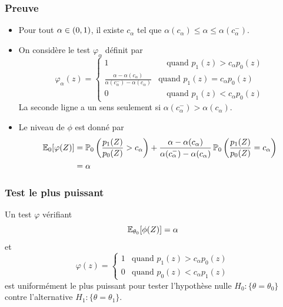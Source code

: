 \begin{frame}
\frametitle{Preuve}
\begin{itemize}
\item Pour tout $\alpha \in \left(0,1\right)$, il existe $c_\alpha$ tel que $\alpha(c_\alpha) \leq \alpha \leq \alpha(c_\alpha^-)$.
\item On considère le test $\varphi_\alpha$ définit par
$$
\varphi_\alpha(z)
=
\begin{cases}
1 & \quad \text{quand $p_1(z) > c_\alpha p_0(z)$} \\
\frac{\alpha - \alpha(c_\alpha)}{\alpha(c_\alpha^-)-\alpha(c_\alpha)} & \text{quand $p_1(z) = c_\alpha p_0(z)$} \\
0  & \quad \text{quand $p_1(z) < c_\alpha p_0(z)$}
\end{cases}
$$
La seconde ligne a un sens seulement si $\alpha(c_\alpha^-)  > \alpha(c_\alpha)$.
\item Le niveau de $\phi$ est donné par
\begin{align*}
\operatorname{{\mathbb E}}_0[\varphi(Z)] &= \operatorname{{\mathbb P}}_0 \left( \frac{p_1(Z)}{p_0(Z)} > c_\alpha \right) + \frac{\alpha-\alpha(c_\alpha)}{\alpha(c_\alpha^-)-\alpha(c_\alpha)}
\operatorname{{\mathbb P}}_0\left( \frac{p_1(Z)}{p_0(Z)} = c_\alpha \right) \\
&= \alpha
\end{align*}
\end{itemize}
\end{frame}


\begin{frame}
\frametitle{Test le plus puissant}
\begin{theorem}
Un test $\varphi$ vérifiant
$$
\operatorname{{\mathbb E}}_{\theta_0}[\phi(Z)]= \alpha
$$
et
\[
\varphi(z)=
\begin{cases}
1 & \text{quand $p_1(z) > c_\alpha p_0(z)$} \\
0 & \text{quand $p_0(z) < c_\alpha p_1(z)$}
\end{cases}
\]
est \alert{uniformément le plus puissant} pour tester l'hypothèse nulle $H_0: \{\theta = \theta_0\}$ contre l'alternative $H_1: \{\theta = \theta_1\}$.
\end{theorem}
\end{frame}


